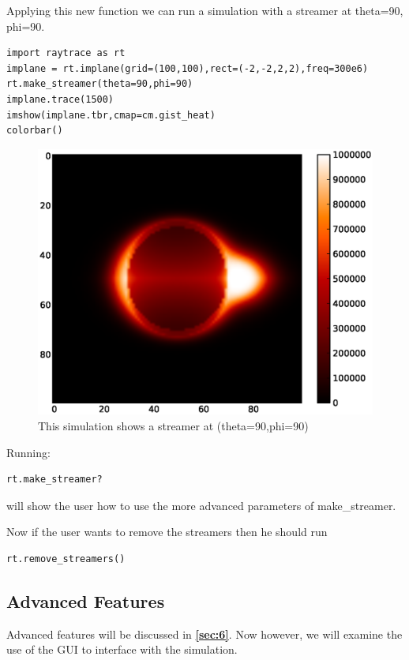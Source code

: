 \documentclass[12pt]{article}
\begin{document}
Applying this new function we can run a simulation with a streamer at
theta=90, phi=90.
\begin{lstlisting}
import raytrace as rt
implane = rt.implane(grid=(100,100),rect=(-2,-2,2,2),freq=300e6)
rt.make_streamer(theta=90,phi=90)
implane.trace(1500)
imshow(implane.tbr,cmap=cm.gist_heat)
colorbar()
\end{lstlisting}

\begin{figure}[ht]
\begin{center}
\includegraphics[scale=.75]{first_streamer}
\end{center}
\caption{This simulation shows a streamer at (theta=90,phi=90)}
\end{figure}

Running:
\begin{lstlisting}
rt.make_streamer?
\end{lstlisting}
will show the user how to use the more advanced parameters of
make\_streamer.

Now if the user wants to remove the streamers then he should run 
\begin{lstlisting}
rt.remove_streamers()
\end{lstlisting}

\subsection{Advanced Features}
Advanced features will be discussed in {\bf \autoref{sec:6}}. Now however,
we will examine the use of the GUI to interface with the simulation.
\end{document}
